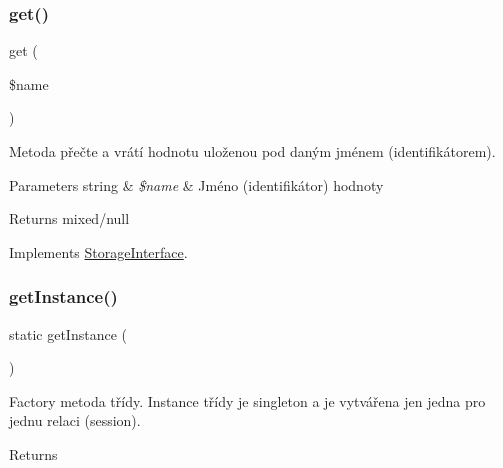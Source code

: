 \subsubsection{\texorpdfstring{get()}{get()}}
{\footnotesize\ttfamily get (\begin{DoxyParamCaption}\item[{}]{\$name }\end{DoxyParamCaption})}

Metoda přečte a vrátí hodnotu uloženou pod daným jménem (identifikátorem). 
\begin{DoxyParams}[1]{Parameters}
string & {\em \$name} & Jméno (identifikátor) hodnoty \\
\hline
\end{DoxyParams}
\begin{DoxyReturn}{Returns}
mixed/null 
\end{DoxyReturn}


Implements \mbox{\hyperlink{interface_pes_1_1_storage_1_1_storage_interface}{Storage\+Interface}}.

\mbox{\label{class_pes_1_1_storage_1_1_session_storage_ac93fbec81f07e5d15f80db907e63dc10}} 
\subsubsection{\texorpdfstring{get\+Instance()}{getInstance()}}
{\footnotesize\ttfamily static get\+Instance (\begin{DoxyParamCaption}{ }\end{DoxyParamCaption})\hspace{0.3cm}{\ttfamily [static]}}

Factory metoda třídy. Instance třídy je singleton a je vytvářena jen jedna pro jednu relaci (session). \begin{DoxyReturn}{Returns}

\end{DoxyReturn}
\mbox{\label{class_pes_1_1_storage_1_1_session_storage_aebff052f548656a86f5b9e0048a5c325}} 
